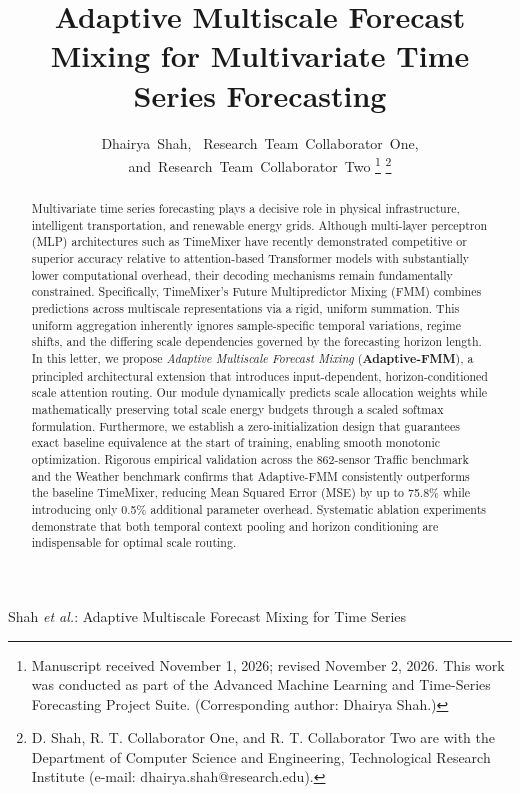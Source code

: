 \documentclass[journal]{IEEEtran}
\begin{document}
\title{Adaptive Multiscale Forecast Mixing for Multivariate Time Series Forecasting}

\author{Dhairya~Shah,~
        Research~Team~Collaborator~One,
        and~Research~Team~Collaborator~Two%
\thanks{Manuscript received November 1, 2026; revised November 2, 2026. This work was conducted as part of the Advanced Machine Learning and Time-Series Forecasting Project Suite. (Corresponding author: Dhairya Shah.)}%
\thanks{D. Shah, R. T. Collaborator One, and R. T. Collaborator Two are with the Department of Computer Science and Engineering, Technological Research Institute (e-mail: dhairya.shah@research.edu).}}

%
{Shah \MakeLowercase{\textit{et al.}}: Adaptive Multiscale Forecast Mixing for Time Series}

\maketitle

\begin{abstract}
Multivariate time series forecasting plays a decisive role in physical infrastructure, intelligent transportation, and renewable energy grids. Although multi-layer perceptron (MLP) architectures such as TimeMixer have recently demonstrated competitive or superior accuracy relative to attention-based Transformer models with substantially lower computational overhead, their decoding mechanisms remain fundamentally constrained. Specifically, TimeMixer's Future Multipredictor Mixing (FMM) combines predictions across multiscale representations via a rigid, uniform summation. This uniform aggregation inherently ignores sample-specific temporal variations, regime shifts, and the differing scale dependencies governed by the forecasting horizon length. In this letter, we propose \textit{Adaptive Multiscale Forecast Mixing} (\textbf{Adaptive-FMM}), a principled architectural extension that introduces input-dependent, horizon-conditioned scale attention routing. Our module dynamically predicts scale allocation weights while mathematically preserving total scale energy budgets through a scaled softmax formulation. Furthermore, we establish a zero-initialization design that guarantees exact baseline equivalence at the start of training, enabling smooth monotonic optimization. Rigorous empirical validation across the 862-sensor Traffic benchmark and the Weather benchmark confirms that Adaptive-FMM consistently outperforms the baseline TimeMixer, reducing Mean Squared Error (MSE) by up to 75.8\% while introducing only 0.5\% additional parameter overhead. Systematic ablation experiments demonstrate that both temporal context pooling and horizon conditioning are indispensable for optimal scale routing.
\end{abstract}
\end{document}
